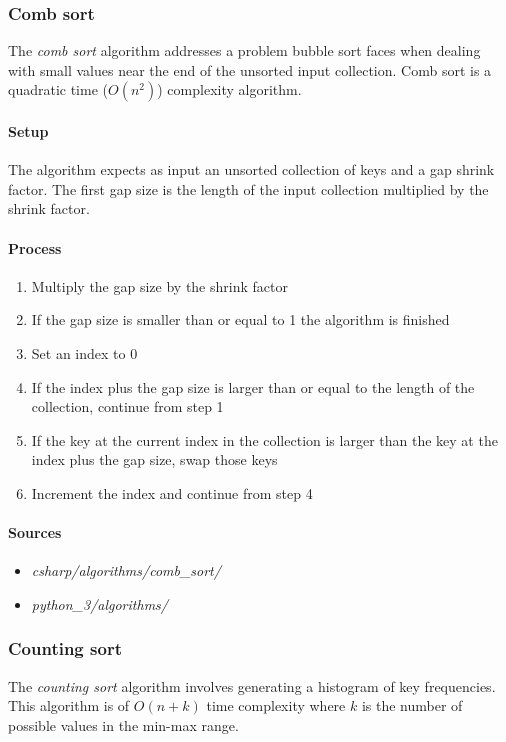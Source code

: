 \documentclass{article}
\begin{document}
{\subsubsection{Comb sort}
The {\em comb sort} algorithm addresses a problem bubble sort faces when dealing with small values near the end of
the unsorted input collection. Comb sort is a quadratic time (\(O(n^2)\)) complexity algorithm.

\paragraph{Setup}
The algorithm expects as input an unsorted collection of keys and a gap shrink factor. The first gap size is the
length of the input collection multiplied by the shrink factor.

\paragraph{Process}
\begin{enumerate}
\item{Multiply the gap size by the shrink factor}
\item{If the gap size is smaller than or equal to 1 the algorithm is finished}
\item{Set an index to 0}
\item{If the index plus the gap size is larger than or equal to the length of the collection, continue from step 1}
\item{If the key at the current index in the collection is larger than the key at the index plus the gap size,
  swap those keys}
\item{Increment the index and continue from step 4}
\end{enumerate}

\begin{samepage}
  \paragraph{Sources}
  \begin{itemize}
  \item{{\em csharp/algorithms/comb\_sort/}}
  \item{{\em python\_3/algorithms/}}
  \end{itemize}
\end{samepage}


\subsubsection{Counting sort}
The {\em counting sort} algorithm involves generating a histogram of key frequencies. This algorithm is of
\(O(n+k)\) time complexity where \(k\) is the number of possible values in the min-max range.

}
\end{document}
